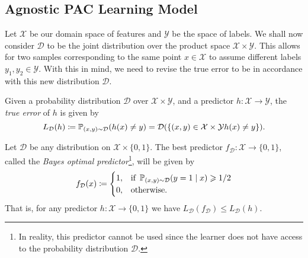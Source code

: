 \subsection{Agnostic PAC Learning Model}

Let \(\mathcal{X}\) be our domain space of features and \(\mathcal{Y}\) be the
space of labels. We shall now consider \(\mathcal{D}\) to be the joint
distribution over the product space \(\mathcal{X} \times \mathcal{Y}\). This
allows for two samples corresponding to the same point \(x \in \mathcal{X}\) to
assume different labels \(y_1, y_2 \in \mathcal{Y}\). With this in mind, we need
to revise the true error to be in accordance with this new distribution
\(\mathcal{D}\).

\begin{definition}
    \label{def:true-error-revised}
    Given a probability distribution \(\mathcal{D}\) over \(\mathcal{X} \times
    \mathcal{Y}\), and a predictor \(h: \mathcal{X} \to \mathcal{Y}\), the
    \emph{true error} of \(h\) is given by
    \[
        L_{\mathcal{D}}(h) \coloneq \operatorname{\mathbb{P}}_{(x, y) \sim \mathcal{D}}(h(x) \neq y)
        = \mathcal{D}(\{(x, y) \in \mathcal{X} \times \mathcal{Y} \relax h(x) \neq y\}).
    \]
\end{definition}

\begin{proposition}
    \label{prop:bayes-optimal-predictor}
    Let \(\mathcal{D}\) be any distribution on \(\mathcal{X} \times \{0, 1\}\). The
    best predictor \(f_{\mathcal{D}}: \mathcal{X} \to \{0, 1\}\), called the
    \emph{Bayes optimal predictor}\footnote{In reality, this predictor cannot be
        used since the learner does not have access to the probability distribution
        \(\mathcal{D}\).}, will be given by
    \[
        f_{\mathcal{D}}(x) \coloneq
        \begin{cases}
            1, & \text{if } \operatorname{\mathbb{P}}_{(x, y) \sim \mathcal{D}}(y = 1 \mid x) \geqslant 1/2 \\
            0, & \text{otherwise.}
        \end{cases}
    \]
    That is, for any predictor \(h: \mathcal{X} \to \{0, 1\}\) we have
    \(L_{\mathcal{D}}(f_{\mathcal{D}}) \leq L_{\mathcal{D}}(h)\).
\end{proposition}

